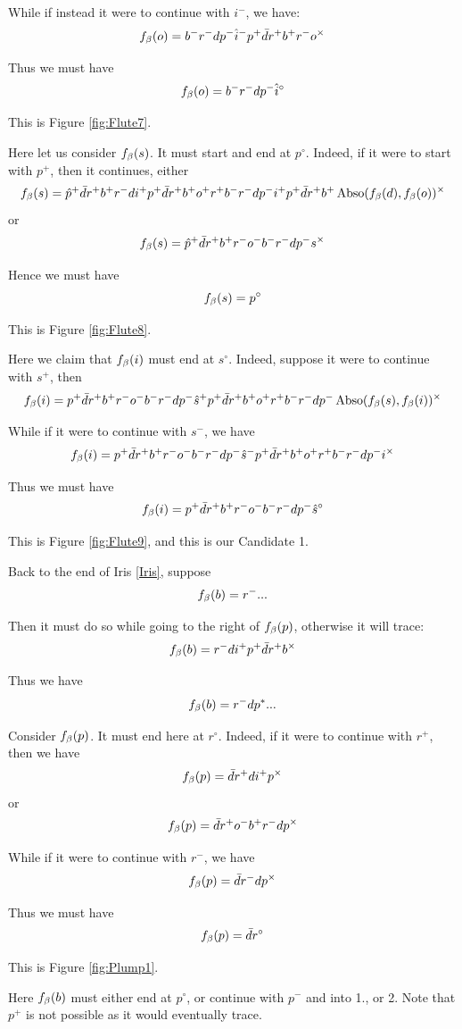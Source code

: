 While if instead it were to continue with $i^-$, we have:
\[
f_\beta(o) = b^- r^- d p^- \hat{i}^- p^+ \bar{d} r^+ b^+ r^- o^\times
\]

Thus we must have
\[
f_\beta(o) = b^- r^- d p^- \hat{i}^\circ
\]

This is Figure \ref{fig:Flute7}.

Here let us consider $f_\beta(s)$. It must start and end at $p^\circ$. Indeed, if it were to start with $p^+$, then it continues, either
\[
f_\beta(s) = \hat{p}^+ \bar{d} r^+ b^+ r^- d i^+ p^+ \bar{d} r^+ b^+ o^+ r^+ b^- r^- d p^- i^+ p^+ \bar{d} r^+ b^+ \operatorname{Abso}(f_\beta(d), f_\beta(o))^\times
\]
or
\[
f_\beta(s) = \hat{p}^+ \bar{d} r^+ b^+ r^- o^- b^- r^- d p^- s^\times
\]

Hence we must have
\[
f_\beta(s) = p^\circ
\]

This is Figure \ref{fig:Flute8}.

Here we claim that $f_\beta(i)$ must end at $s^\circ$. Indeed, suppose it were to continue with $s^+$, then
\[
f_\beta(i) = p^+ \bar{d} r^+ b^+ r^- o^- b^- r^- d p^- \hat{s}^+ p^+ \bar{d} r^+ b^+ o^+ r^+ b^- r^- d p^- \operatorname{Abso}(f_\beta(s),  f_\beta(i))^\times
\]

While if it were to continue with $s^-$, we have
\[
f_\beta(i) = p^+ \bar{d} r^+ b^+ r^- o^- b^- r^- d p^- \hat{s}^- p^+ \bar{d} r^+ b^+ o^+ r^+ b^- r^- d p^- i^\times
\]

Thus we must have
\[
f_\beta(i) = p^+ \bar{d} r^+ b^+ r^- o^- b^- r^- d p^- \hat{s}^\circ
\]

This is Figure \ref{fig:Flute9}, and this is our Candidate 1.


 \label{Plump}
Back to the end of Iris \ref{Iris}, suppose
\[
f_\beta(b) = r^-...
\]

Then it must do so while going to the right of $f_\beta(p)$, otherwise it will trace:
\[
f_\beta(b) = r^- d i^+ p^+ \bar{d} r^+ b^\times
\]

Thus we have
\[
f_\beta(b) = r^- d p^*...
\]

Consider $f_\beta(p)$. It must end here at $r^\circ$. Indeed, if it were to continue with $r^+$, then we have
\[
f_\beta(p) = \bar{d} r^+ d i^+ p^\times
\]
or
\[
f_\beta(p) = \bar{d} r^+ o^- b^+ r^- d p^\times
\]

While if it were to continue with $r^-$, we have
\[
f_\beta(p) = \bar{d} r^- d p^\times
\]

Thus we must have
\[
f_\beta(p) = \bar{d} r^\circ
\]

This is Figure \ref{fig:Plump1}.

Here $f_\beta(b)$ must either end at $p^\circ$, or continue with $p^-$ and into 1., or 2. Note that $p^+$ is not possible as it would eventually trace.

